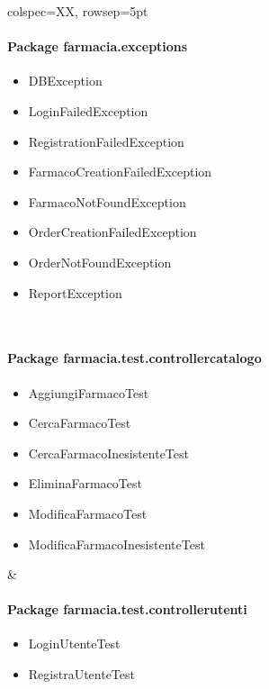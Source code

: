 \begin{table}[pt]
\begin{tblr}{colspec=XX, rowsep=5pt}
\begin{minipage}[t]{0.4\textwidth}
			\paragraph{Package farmacia.exceptions}
			\begin{itemize}[label=--]
				\item DBException
				\item LoginFailedException
				\item RegistrationFailedException
				\item FarmacoCreationFailedException
				\item FarmacoNotFoundException
				\item OrderCreationFailedException
				\item OrderNotFoundException
				\item ReportException
			\end{itemize}
		\end{minipage} \\
		\begin{minipage}[t]{0.45\textwidth}
			\paragraph{Package farmacia.test.controllercatalogo}
			\begin{itemize}[label=--]
				\item AggiungiFarmacoTest
				\item CercaFarmacoTest
				\item CercaFarmacoInesistenteTest
				\item EliminaFarmacoTest
				\item ModificaFarmacoTest
				\item ModificaFarmacoInesistenteTest
			\end{itemize}
		\end{minipage} &
		\begin{minipage}[t]{0.4\textwidth}
			\paragraph{Package farmacia.test.controllerutenti}
			\begin{itemize}[label=--]
				\item LoginUtenteTest
				\item RegistraUtenteTest
			\end{itemize}
		\end{minipage} \\
		\begin{minipage}[t]{0.45\textwidth}

\end{minipage}
\end{tblr}
\end{table}
